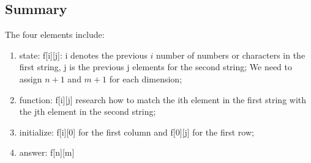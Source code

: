 \documentclass[../main.tex]{subfiles}
\begin{document}
\subsection{Summary}
The four elements include:
\begin{enumerate}
    \item state: f[i][j]: i denotes the previous $i$ number of numbers or characters in the first string, j is the previous j elements for the second string; We need to assign $n+1$ and $m+1$ for each dimension; 
    \item function: f[i][j] research how to match the ith element in the first string with the jth element in the second string;
    \item initialize: f[i][0] for the first column and f[0][j] for the first row;
    \item answer: f[n][m]
\end{enumerate}

\end{document}
